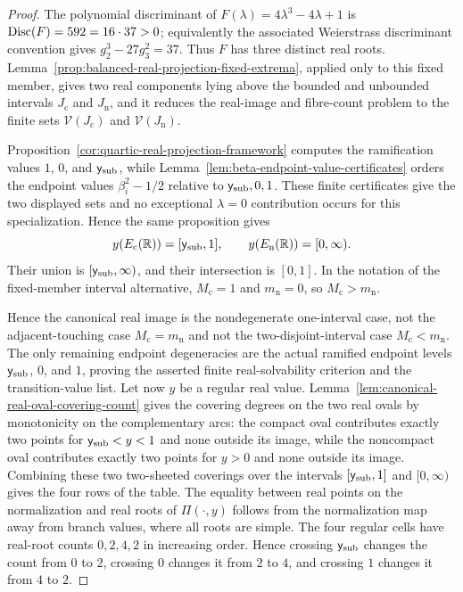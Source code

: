 \begin{proof}
The polynomial discriminant of \(F(\lambda)=4\lambda^3-4\lambda+1\) is \({\rm Disc}(F)=592=16\cdot37>0\); equivalently the associated Weierstrass discriminant convention gives \(g_2^3-27g_3^2=37\).  Thus \(F\) has three distinct real roots.  Lemma~\ref{prop:balanced-real-projection-fixed-extrema}, applied only to this fixed member, gives two real components lying above the bounded and unbounded intervals \(J_{\mathrm c}\) and \(J_{\mathrm n}\), and it reduces the real-image and fibre-count problem to the finite sets \(\mathcal V(J_{\mathrm c})\) and \(\mathcal V(J_{\mathrm n})\).

Proposition~\ref{cor:quartic-real-projection-framework} computes the ramification values \(1\), \(0\), and \(\mathsf{y}_{\mathrm{sub}}\), while Lemma~\ref{lem:beta-endpoint-value-certificates} orders the endpoint values \(\beta_i^2-1/2\) relative to \(\mathsf{y}_{\mathrm{sub}},0,1\).  These finite certificates give the two displayed sets and no exceptional \(\lambda=0\) contribution occurs for this specialization.  Hence the same proposition gives
\[
y(E_{\mathrm c}(\mathbb{R}))=[\mathsf{y}_{\mathrm{sub}},1],
\qquad
y(E_{\mathrm n}(\mathbb{R}))=[0,\infty).
\]
Their union is \([\mathsf{y}_{\mathrm{sub}},\infty)\), and their intersection is \([0,1]\).  In the notation of the fixed-member interval alternative, $M_{\mathrm c}=1$ and $m_{\mathrm n}=0$, so $M_{\mathrm c}>m_{\mathrm n}$.

Hence the canonical real image is the nondegenerate one-interval case, not the adjacent-touching case $M_{\mathrm c}=m_{\mathrm n}$ and not the two-disjoint-interval case $M_{\mathrm c}<m_{\mathrm n}$.  The only remaining endpoint degeneracies are the actual ramified endpoint levels $\mathsf{y}_{\mathrm{sub}}$, $0$, and $1$, proving the asserted finite real-solvability criterion and the transition-value list.
Let now \(y\) be a regular real value.  Lemma~\ref{lem:canonical-real-oval-covering-count} gives the covering degrees on the two real ovals by monotonicity on the complementary arcs: the compact oval contributes exactly two points for \(\mathsf{y}_{\mathrm{sub}}<y<1\) and none outside its image, while the noncompact oval contributes exactly two points for \(y>0\) and none outside its image.  Combining these two two-sheeted coverings over the intervals \([\mathsf{y}_{\mathrm{sub}},1]\) and \([0,\infty)\) gives the four rows of the table.
The equality between real points on the normalization and real roots of \(\Pi(\cdot,y)\) follows from the normalization map away from branch values, where all roots are simple.
The four regular cells have real-root counts \(0,2,4,2\) in increasing order.  Hence crossing \(\mathsf{y}_{\mathrm{sub}}\) changes the count from \(0\) to \(2\), crossing \(0\) changes it from \(2\) to \(4\), and crossing \(1\) changes it from \(4\) to \(2\).


\end{proof}
